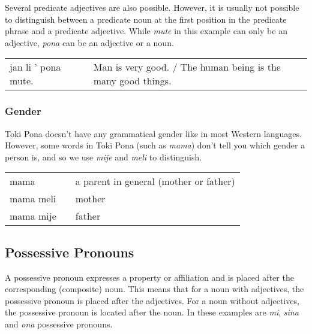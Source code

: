 Several predicate adjectives are also possible. 
However, it is usually not possible to distinguish between a predicate noun at the first position in the predicate phrase and a predicate adjective. 
While \textit{mute} in this example can only be an adjective, \textit{pona} can be an adjective or a noun. 

\begin{supertabular}{p{5,5cm}|ll}
jan li ' pona mute. &&  Man is very good. / The human being is the many good things. \\
\end{supertabular} 

\subsubsection*{Gender}
%
Toki Pona doesn't have any grammatical gender like in most Western languages.  
However, some words in Toki Pona (such as \textit{mama}) don't tell you which gender a person is, and so we use \textit{mije} and \textit{meli} to distinguish. 

\begin{supertabular}{p{5,5cm}|ll}
mama && a parent in general (mother or father) \\
mama meli && mother \\
mama mije && father \\
\end{supertabular} 

%
\subsection*{Possessive Pronouns}

A possessive pronoun expresses a property or affiliation and is placed after the corresponding (composite) noun. 
This means that for a noun with adjectives, the possessive pronoun is placed after the adjectives. 
For a noun without adjectives, the possessive pronoun is located after the noun.
In these examples are \textit{mi}, \textit{sina} and \textit{ona} possessive pronouns. 

